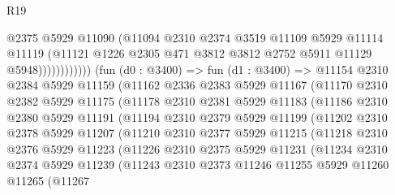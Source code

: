 \begin{lexlean}{R19}
\begin{coremodule}
                            @2375
                            @5929
                            @11090
                            (@11094
                              @2310
                              @2374
                              @3519
                              @11109
                              @5929
                              @11114
                              @11119
                              (@11121
                                @1226
                                @2305
                                @471
                                @3812
                                @3812
                                @2752
                                @5911
                                @11129
                                @5948))))))))))))
        (fun (d0 : @3400) =>
        fun (d1 : @3400) =>
        @11154
          @2310
          @2384
          @5929
          @11159
          (@11162
            @2336
            @2383
            @5929
            @11167
            (@11170
              @2310
              @2382
              @5929
              @11175
              (@11178
                @2310
                @2381
                @5929
                @11183
                (@11186
                  @2310
                  @2380
                  @5929
                  @11191
                  (@11194
                    @2310
                    @2379
                    @5929
                    @11199
                    (@11202
                      @2310
                      @2378
                      @5929
                      @11207
                      (@11210
                        @2310
                        @2377
                        @5929
                        @11215
                        (@11218
                          @2310
                          @2376
                          @5929
                          @11223
                          (@11226
                            @2310
                            @2375
                            @5929
                            @11231
                            (@11234
                              @2310
                              @2374
                              @5929
                              @11239
                              (@11243
                                @2310
                                @2373
                                @11246
                                @11255
                                @5929
                                @11260
                                @11265
                                (@11267

\end{coremodule}
\end{lexlean}
